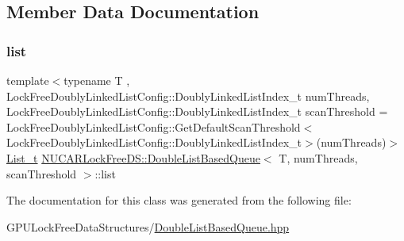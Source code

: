 \subsection{Member Data Documentation}
\mbox{\label{class_n_u_c_a_r_lock_free_d_s_1_1_double_list_based_queue_ac63ca28afaaf2cb487e9ff03b601e20b}} 
\subsubsection{\texorpdfstring{list}{list}}
{\footnotesize\ttfamily template$<$typename T , Lock\+Free\+Doubly\+Linked\+List\+Config\+::\+Doubly\+Linked\+List\+Index\+\_\+t num\+Threads, Lock\+Free\+Doubly\+Linked\+List\+Config\+::\+Doubly\+Linked\+List\+Index\+\_\+t scan\+Threshold = Lock\+Free\+Doubly\+Linked\+List\+Config\+::\+Get\+Default\+Scan\+Threshold$<$\+Lock\+Free\+Doubly\+Linked\+List\+Config\+::\+Doubly\+Linked\+List\+Index\+\_\+t$>$(num\+Threads)$>$ \\
\mbox{\hyperlink{class_n_u_c_a_r_lock_free_d_s_1_1_double_list_based_queue_adfcec8aa40c6690e45107405c2fa2c35}{List\+\_\+t}} \mbox{\hyperlink{class_n_u_c_a_r_lock_free_d_s_1_1_double_list_based_queue}{N\+U\+C\+A\+R\+Lock\+Free\+D\+S\+::\+Double\+List\+Based\+Queue}}$<$ T, num\+Threads, scan\+Threshold $>$\+::list\hspace{0.3cm}{\ttfamily [private]}}



The documentation for this class was generated from the following file\+:\begin{DoxyCompactItemize}
\item 
G\+P\+U\+Lock\+Free\+Data\+Structures/\mbox{\hyperlink{_double_list_based_queue_8hpp}{Double\+List\+Based\+Queue.\+hpp}}\end{DoxyCompactItemize}
